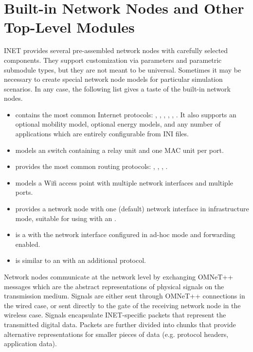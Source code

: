 \section{Built-in Network Nodes and Other Top-Level Modules}

INET provides several pre-assembled network nodes with carefully selected
components. They support customization via parameters and parametric
submodule types, but they are not meant to be universal. Sometimes it may
be necessary to create special network node models for particular
simulation scenarios. In any case, the following list gives a taste of the
built-in network nodes.

\begin{itemize}
  \item {} contains the most common Internet protocols:
     , , , ,
     , . It also supports an
     optional mobility model, optional energy models, and any number of
     applications which are entirely configurable from INI files.
  \item {} models an  switch containing
     a relay unit and one MAC unit per port.
  \item {} provides the most common routing protocols:
     , , , .
  \item {} models a Wifi access point with multiple
      network interfaces and multiple 
     ports.
  \item {} provides a network node with one (default)
      network interface in infrastructure mode,
     suitable for using with an .
  \item {} is a  with the network
     interface configured in ad-hoc mode and forwarding enabled.
  \item {} is similar to an  with
     an additional  protocol.
\end{itemize}

Network nodes communicate at the network level by exchanging OMNeT++ messages 
which are the abstract representations of physical signals on the 
transmission medium.  Signals are either sent through OMNeT++ connections 
in the wired case, or sent directly to the gate of the receiving network node 
in the wireless case. Signals encapsulate INET-specific packets that represent 
the transmitted digital data. Packets are further divided into chunks that
provide alternative representations for smaller pieces of data (e.g. 
protocol headers, application data).

